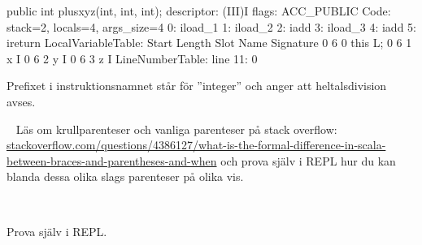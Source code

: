 \begin{REPL}
public int plusxyz(int, int, int);
  descriptor: (III)I
  flags: ACC_PUBLIC
  Code:
    stack=2, locals=4, args_size=4
       0: iload_1
       1: iload_2
       2: iadd
       3: iload_3
       4: iadd
       5: ireturn
    LocalVariableTable:
      Start  Length  Slot  Name   Signature
          0       6     0  this   L;
          0       6     1     x   I
          0       6     2     y   I
          0       6     3     z   I
    LineNumberTable:
      line 11: 0
\end{REPL}


\SubtaskSolved Prefixet  i instruktionsnamnet  står för ''integer'' och anger att heltalsdivision avses.

\QUESTEND





\QUESTBEGIN

\Task  \what~ Läs om krullparenteser och vanliga parenteser på stack overflow: \\ \href{http://stackoverflow.com/questions/4386127/what-is-the-formal-difference-in-scala-between-braces-and-parentheses-and-when}{stackoverflow.com/questions/4386127/what-is-the-formal-difference-in-scala-between-braces-and-parentheses-and-when} och prova själv i REPL hur du kan blanda dessa olika slags parenteser på olika vis.

\SOLUTION

\TaskSolved \what~

\SubtaskSolved Prova själv i REPL.

\QUESTEND
